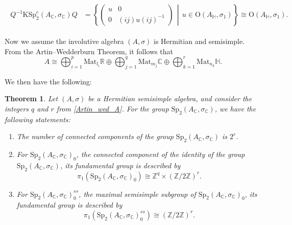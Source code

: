 \documentclass[oneside,11pt]{amsart}
\newtheorem{thm}{Theorem}[section]
\theoremstyle{definition}
\theoremstyle{remark}
\newcommand{\midwd}{\,\middle\vert\,}
\numberwithin{thm}{section}
\numberwithin{equation}{section}
\begin{document}
\begin{align}\label{eq:conj_symp_cpx}
\begin{aligned}
    Q^{-1}\mathrm{KSp}^c_{2}(A_\mathbb C,\sigma_\mathbb C)Q&=\left\{\begin{pmatrix}
    u & 0 \\
    0 & (ij)u(ij)^{-1}
    \end{pmatrix}\midwd u\in \mathrm{O}{(A_\mathbb H,\sigma_1)}\right\}\cong \mathrm{O}{(A_\mathbb H,\sigma_1)}.
\end{aligned}
\end{align}

Now we assume the involutive algebra $(A,\sigma)$ is Hermitian and semisimple. From the Artin--Wedderburn Theorem, it follows that
\begin{equation}\label{Artin_wed_A}
A \cong \bigoplus_{i=1}^p \mathrm{Mat}_{l_i}\mathbb{R} \oplus \bigoplus_{j=1}^q \mathrm{Mat}_{m_j}\mathbb{C} \oplus \bigoplus_{k=1}^r \mathrm{Mat}_{n_k}\mathbb{H}.
\end{equation}


We then have the following:

\begin{thm}\label{prop:max_semisimple_simply_con}
Let $(A, \sigma)$ be a Hermitian semisimple algebra, and consider the integers $q$ and $r$ from \eqref{Artin_wed_A}. For the group $\mathrm{Sp}_2(A_\mathbb{C}, \sigma_{\mathbb{C}})$, we have the following statements: 
\begin{enumerate}
\item The number of connected components of the group $\mathrm{Sp}_2(A_\mathbb{C}, \sigma_{\mathbb{C}})$ is $2^r$.
\item For $\mathrm{Sp}_2(A_\mathbb{C}, \sigma_{\mathbb{C}})_0$, the connected component of the identity of the group $\mathrm{Sp}_2(A_\mathbb{C}, \sigma_{\mathbb{C}})$, its fundamental group is described by
\[\pi_1\left(\mathrm{Sp}_2(A_\mathbb{C}, \sigma_{\mathbb{C}})_0\right)\cong \mathbb{Z}^q\times (\mathbb{Z}/2\mathbb{Z})^r.\] 
\item For $\mathrm{Sp}_2(A_\mathbb{C}, \sigma_{\mathbb{C}})_0^{ss}$, the maximal semisimple subgroup of $\mathrm{Sp}_2(A_\mathbb{C}, \sigma_{\mathbb{C}})_0$, its fundamental group is described by
\[\pi_1\left(\mathrm{Sp}_2(A_\mathbb{C}, \sigma_{\mathbb{C}})_0^{ss}\right)\cong  (\mathbb{Z}/2\mathbb{Z})^r.\]
\end{enumerate}
\end{thm}
\end{document}

